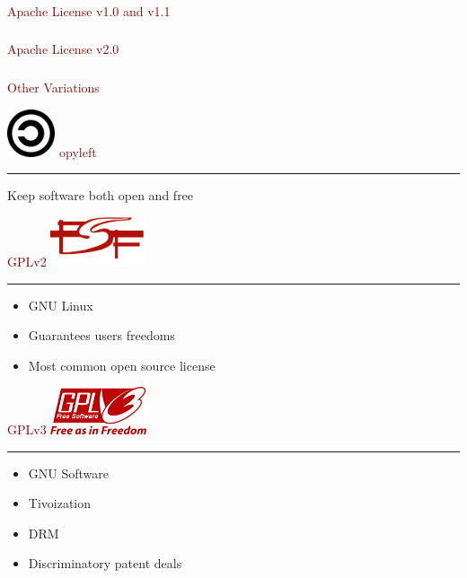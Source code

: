 \documentclass[c]{beamer}
\newcommand{\TITLE}{\fontsize{50pt}{1em}\selectfont}
\begin{document}
  \begin{frame}
    \frametitle{}
    \textcolor{darkred}{{\TITLE Apache License v1.0 and v1.1 \\}}
  \end{frame}
  \begin{frame}
    \frametitle{}
    \textcolor{darkred}{{\TITLE Apache License v2.0 \\}}
  \end{frame}
  \begin{frame}
    \frametitle{}
    \textcolor{darkred}{{\TITLE Other Variations \\}}
  \end{frame}
  \begin{frame}
    \includegraphics[width=40pt]{copyleft}
    \textcolor{darkred}{{\TITLE opyleft \\}}
    \vspace{1em} \hrule \vspace{1em}
    {\fontsize{20pt}{1em}\selectfont Keep software both open and free}
  \end{frame}
  \begin{frame}
    \textcolor{darkred}{{\TITLE GPLv2}}
    \hfill \includegraphics[width=80pt,trim = 0px 150px 0px 0px]{fsf} \\
    \vspace{1em} \hrule \vspace{1em}
    \LARGE
    \begin{itemize}
    \item GNU Linux
    \item Guarantees users freedoms
    \item Most common open source license
    \end{itemize}
  \end{frame}
  \begin{frame}
    \textcolor{darkred}{{\TITLE GPLv3}}
    \hfill \includegraphics[width=80pt]{gplv3} \\
    \vspace{1em} \hrule \vspace{1em}
    \LARGE
    \begin{itemize}
    \item GNU Software
    \item Tivoization
    \item DRM
    \item Discriminatory patent deals
     \end{itemize}
  \end{frame}
\end{document}
